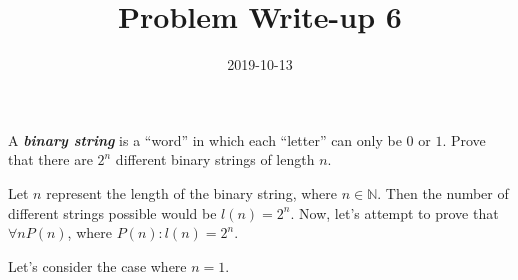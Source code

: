 \documentclass[a4paper,12pt]{article}
\title{Problem Write-up 6}
\date{2019-10-13}
\begin{document}
    \begin{problem}
        A \textbf{\textit{binary string}} is a “word” in which each “letter” can only be \(0\) or \(1\). Prove that there are \(2^n\) different binary strings of length \(n\).
    \end{problem}
    \begin{answer}
        Let \(n\) represent the length of the binary string, where \(n \in \mathbb{N}\). Then the number of different strings possible would be \(l(n) = 2^n\). Now, let's attempt to prove that \(\forall n P(n)\), where \(P(n): l(n) = 2^n\).
        
        Let's consider the case where \(n = 1\).
    \end{answer}
\end{document}

